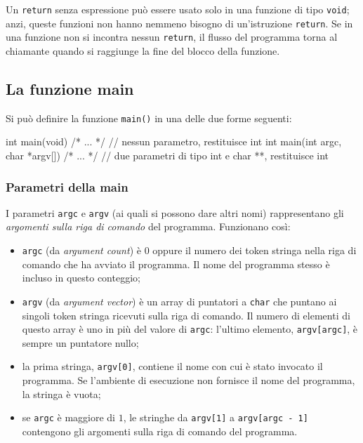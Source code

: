 \documentclass[11pt,a4paper]{article}
\begin{document}
Un \lstinline|return| senza espressione può essere usato solo in una funzione di tipo \lstinline|void|; anzi, queste funzioni non hanno nemmeno bisogno di un'istruzione \lstinline|return|. Se in una funzione non si incontra nessun \lstinline|return|, il flusso del programma torna al chiamante quando si raggiunge la fine del blocco della funzione.

\subsection{La funzione main}

Si può definire la funzione \lstinline|main()| in una delle due forme seguenti:
\begin{codice}
int main(void) { /* ... */ }                  // nessun parametro, restituisce int
int main(int argc, char *argv[]) { /* ... */ } // due parametri di tipo int e char **, restituisce int
\end{codice}

\subsubsection{Parametri della main}

I parametri \lstinline|argc| e \lstinline|argv| (ai quali si possono dare altri nomi) rappresentano gli \emph{argomenti sulla riga di comando} del programma. Funzionano così:
\begin{itemize}
    \item \lstinline|argc| (da \emph{argument count}) è $0$ oppure il numero dei token stringa nella riga di comando che ha avviato il programma. Il nome del programma stesso è incluso in questo conteggio;
    \item \lstinline|argv| (da \emph{argument vector}) è un array di puntatori a \lstinline|char| che puntano ai singoli token stringa ricevuti sulla riga di comando. Il numero di elementi di questo array è uno in più del valore di \lstinline|argc|: l'ultimo elemento, \lstinline|argv[argc]|, è sempre un puntatore nullo;
    \item la prima stringa, \lstinline|argv[0]|, contiene il nome con cui è stato invocato il programma. Se l'ambiente di esecuzione non fornisce il nome del programma, la stringa è vuota;
    \item se \lstinline|argc| è maggiore di $1$, le stringhe da \lstinline|argv[1]| a \lstinline|argv[argc - 1]| contengono gli argomenti sulla riga di comando del programma.
\end{itemize}
\end{document}
